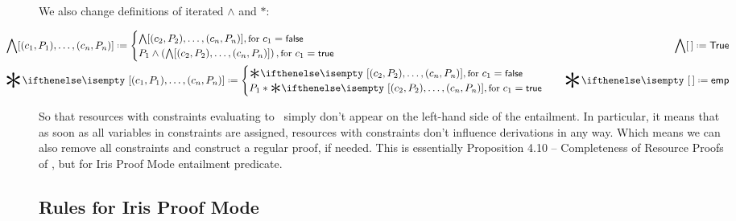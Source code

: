 We also change definitions of iterated \(\wedge\) and \(*\):\\
\begin{minipage}[t]{1.1\linewidth}
  \begin{align*}
    & \hspace{-0.1\linewidth}
      \bigwedge  [(c_1, P_1), \dots, (c_n, P_n)] \defeq
      \begin{cases}
        \bigwedge [(c_2, P_2), \dots, (c_n, P_n)],
          {\small \text{for } c_1 = \false}\\
        P_1 \wedge \left( \bigwedge [(c_2, P_2), \dots, (c_n, P_n)] \right),
          {\small \text{for } c_1 = \true }
      \end{cases}
    & \bigwedge [\,] \defeq \True \\
    & \hspace{-0.1\linewidth}
      \Sep {[(c_1, P_1), \dots, (c_n, P_n)]} \defeq
      \begin{cases}
        \Sep {[(c_2, P_2), \dots, (c_n, P_n)]},
          {\small \text{for } c_1 = \false} \\
        P_1 * \Sep {[(c_2, P_2), \dots, (c_n, P_n)]},
          {\small \text{for } c_1 = \true}
      \end{cases}
    & \Sep {[\,]} \defeq \emp
  \end{align*}
\end{minipage}

So that resources with constraints evaluating to \false~simply don't appear on the left-hand side of the entailment.
In particular, it means that as soon as all variables in constraints are assigned, resources with \false constraints don't influence derivations in any way.
Which means we can also remove all constraints and construct a regular proof, if needed.
This is essentially Proposition 4.10 -- Completeness of Resource Proofs of \citet[page~25]{harlandResourceDistributionBooleanConstraints2003}, but for Iris Proof Mode entailment predicate.

\subsection{Rules for Iris Proof Mode}

